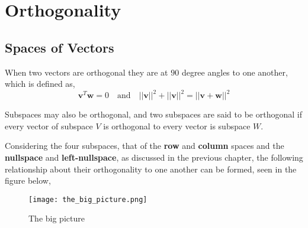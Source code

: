 \section{Orthogonality}
   
    \subsection{Spaces of Vectors}
        When two vectors are orthogonal they are at \(90\) degree angles to one another, which is defined as,
        \begin{equation}
            \boldsymbol{v}^T \boldsymbol{w} = 0
            \quad \textrm{and} \quad
            || \boldsymbol{v} ||^2 + || \boldsymbol{v} ||^2 = || \boldsymbol{v} + \boldsymbol{w} ||^2
        \end{equation}

        \par \hfill \break
        Subspaces may also be orthogonal, and two subspaces are said to be orthogonal if every vector of subspace \(V\)
        is orthogonal to every vector is subspace \(W\).

        \par \hfill \break
        Considering the four subspaces, that of the \textbf{row} and \textbf{column} spaces and the \textbf{nullspace} 
        and \textbf{left-nullspace}, as discussed in the previous chapter, the following relationship about their 
        orthogonality to one another can be formed, seen in the figure below,

        \begin{figure}[h]
            \texttt{[image: the\_big\_picture.png]}
            \centering
            \caption{The big picture}
        \end{figure}


